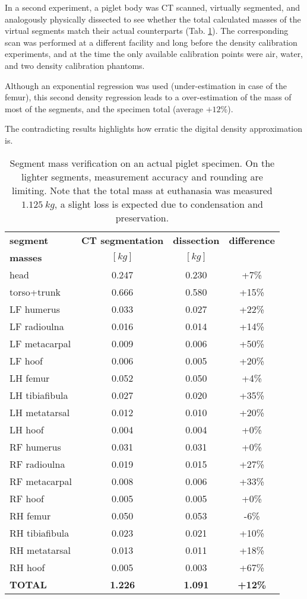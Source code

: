 In a second experiment, a piglet body was CT scanned, virtually segmented, and analogously physically dissected to see whether the total calculated masses of the virtual segments match their actual counterparts (Tab. \ref{tab:pigletdissection}).
The corresponding scan was performed at a different facility and long before the density calibration experiments, and at the time the only available calibration points were air, water, and two density calibration phantoms.

Although an exponential regression was used (under-estimation in case of the femur), this second density regression leads to a over-estimation of the mass of most of the segments, and the specimen total (average \(+12 \%\)).

The contradicting results highlights how erratic the digital density approximation is.



\begin{table}[p]
\caption{\label{tab:pigletdissection}Segment mass verification on an actual piglet specimen. On the lighter segments, measurement accuracy and rounding are limiting. Note that the total mass at euthanasia was measured \(1.125\ kg\), a slight loss is expected due to condensation and preservation.}
\centering
\begin{tabular}{|l|c|c|c|}
\hline
\textbf{segment} & \textbf{CT segmentation} & \textbf{dissection} & \textbf{difference}\\[0pt]
\textbf{masses} & \([kg]\) & \([kg]\) & \\[0pt]
\hline
\hline
head & 0.247 & 0.230 & +7\%\\[0pt]
torso+trunk & 0.666 & 0.580 & +15\%\\[0pt]
LF humerus & 0.033 & 0.027 & +22\%\\[0pt]
LF radioulna & 0.016 & 0.014 & +14\%\\[0pt]
LF metacarpal & 0.009 & 0.006 & +50\%\\[0pt]
LF hoof & 0.006 & 0.005 & +20\%\\[0pt]
LH femur & 0.052 & 0.050 & +4\%\\[0pt]
LH tibiafibula & 0.027 & 0.020 & +35\%\\[0pt]
LH metatarsal & 0.012 & 0.010 & +20\%\\[0pt]
LH hoof & 0.004 & 0.004 & +0\%\\[0pt]
RF humerus & 0.031 & 0.031 & +0\%\\[0pt]
RF radioulna & 0.019 & 0.015 & +27\%\\[0pt]
RF metacarpal & 0.008 & 0.006 & +33\%\\[0pt]
RF hoof & 0.005 & 0.005 & +0\%\\[0pt]
RH femur & 0.050 & 0.053 & -6\%\\[0pt]
RH tibiafibula & 0.023 & 0.021 & +10\%\\[0pt]
RH metatarsal & 0.013 & 0.011 & +18\%\\[0pt]
RH hoof & 0.005 & 0.003 & +67\%\\[0pt]
\hline
\textbf{TOTAL} & \textbf{1.226} & \textbf{1.091} & \textbf{+12\%}\\[0pt]
\hline
\hline
\end{tabular}
\end{table}



